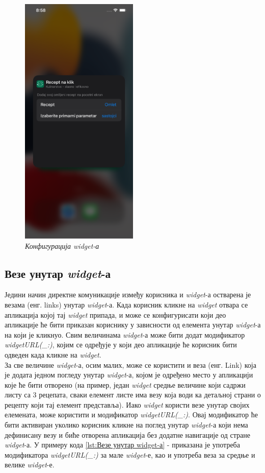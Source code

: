 \documentclass[12pt,oneside]{memoir}
\begin{document}
\begin{figure}[H]
\includegraphics[width=0.5\textwidth]{images/Widget_configuration.png}
\centering
\caption{\textit{Конфигурација widget-а}}
\label{slika:widget_configuration}
\end{figure}

\subsection{Везе унутар \textit{widget}-а}
\indent Једини начин директне комуникације између корисника и \textit{widget}-а остварена је везама (енг. links) унутар \textit{widget}-а. Када корисник кликне на \textit{widget} отвара се апликација којој тај \textit{widget} припада, и може се конфигурисати који део апликације ће бити приказан кориснику у зависности од елемента унутар \textit{widget}-а на који је кликнуо. Свим величинама \textit{widget}-а може бити додат модификатор \textit{widgetURL(\_:)}, којим се одређује у који део апликације ће корисник бити одведен када кликне на \textit{widget}.
\\
\indent За све величине \textit{widget}-а, осим малих, може се користити и веза (енг. Link) која је додата једном погледу унутар \textit{widget}-а, којом је одређено место у апликацији које ће бити отворено (на пример, један \textit{widget} средње величине који садржи листу са 3 рецепата, сваки елемент листе има везу која води ка детаљној страни о рецепту који тај елемент представља). Иако \textit{widget} користи везе унутар својих елемената, може користити и модификатор \textit{widgetURL(\_:)}. Овај модификатор ће бити активиран уколико корисник кликне на поглед унутар \textit{widget}-а који нема дефинисану везу и биће отворена апликација без додатне навигације од стране \textit{widget}-а. У примеру кода \ref{lst:Везе унутар widget-а} -  приказана је употреба модификатора \textit{widgetURL(\_:)} за мале \textit{widget}-е, као и употреба веза за средње и велике \textit{widget}-е.
\end{document}
